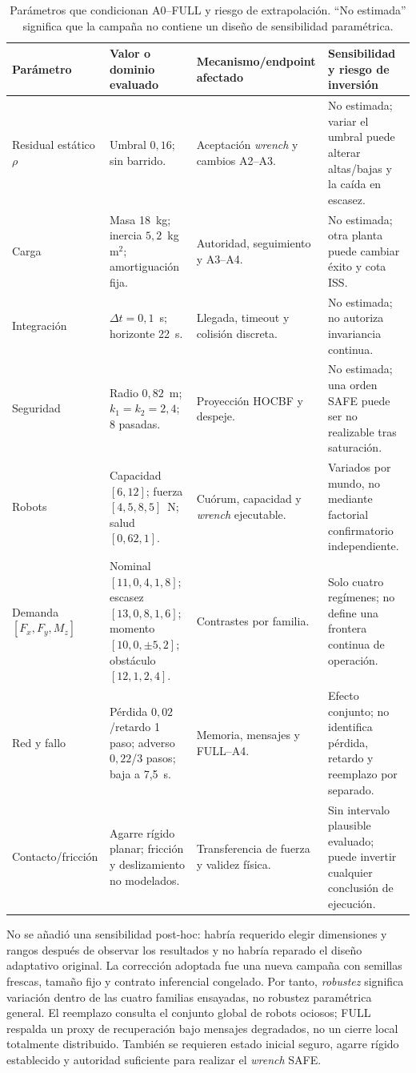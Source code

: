 \begin{table}[H]
\centering
\scriptsize
\begin{tabularx}{\textwidth}{@{}p{}p{}p{}X@{}}
\toprule
Parámetro & Valor o dominio evaluado & Mecanismo/endpoint afectado & Sensibilidad y riesgo de inversión \\
\midrule
Residual estático $\rho$ & Umbral $0{,}16$; sin barrido. & Aceptación \emph{wrench} y cambios A2--A3. & No estimada; variar el umbral puede alterar altas/bajas y la caída en escasez. \\
Carga & Masa 18~kg; inercia $5{,}2$~kg\,m$^2$; amortiguación fija. & Autoridad, seguimiento y A3--A4. & No estimada; otra planta puede cambiar éxito y cota ISS. \\
Integración & $\Delta t=0{,}1$~s; horizonte 22~s. & Llegada, timeout y colisión discreta. & No estimada; no autoriza invariancia continua. \\
Seguridad & Radio $0{,}82$~m; $k_1=k_2=2{,}4$; 8 pasadas. & Proyección HOCBF y despeje. & No estimada; una orden SAFE puede ser no realizable tras saturación. \\
Robots & Capacidad $[6,12]$; fuerza $[4{,}5,8{,}5]$~N; salud $[0{,}62,1]$. & Cuórum, capacidad y \emph{wrench} ejecutable. & Variados por mundo, no mediante factorial confirmatorio independiente. \\
Demanda $[F_x,F_y,M_z]$ & Nominal $[11,0{,}4,1{,}8]$; escasez $[13,0{,}8,1{,}6]$; momento $[10,0,\pm5{,}2]$; obstáculo $[12,1,2{,}4]$. & Contrastes por familia. & Solo cuatro regímenes; no define una frontera continua de operación. \\
Red y fallo & Pérdida $0{,}02$/retardo 1 paso; adverso $0{,}22$/3 pasos; baja a 7,5~s. & Memoria, mensajes y FULL--A4. & Efecto conjunto; no identifica pérdida, retardo y reemplazo por separado. \\
Contacto/fricción & Agarre rígido planar; fricción y deslizamiento no modelados. & Transferencia de fuerza y validez física. & Sin intervalo plausible evaluado; puede invertir cualquier conclusión de ejecución. \\
\bottomrule
\end{tabularx}
\caption{Parámetros que condicionan A0--FULL y riesgo de extrapolación. ``No estimada'' significa que la campaña no contiene un diseño de sensibilidad paramétrica.}
\label{tab:parametros-integrados}
\end{table}

No se añadió una sensibilidad post-hoc: habría requerido elegir dimensiones y rangos
después de observar los resultados y no habría reparado el diseño adaptativo original.
La corrección adoptada fue una nueva campaña con semillas frescas, tamaño fijo y contrato
inferencial congelado. Por tanto, \emph{robustez} significa variación dentro de las cuatro
familias ensayadas, no robustez paramétrica general. El reemplazo consulta el conjunto
global de robots ociosos; FULL respalda un proxy de recuperación bajo mensajes degradados,
no un cierre local totalmente distribuido. También se requieren estado inicial seguro,
agarre rígido establecido y autoridad suficiente para realizar el \emph{wrench} SAFE.

